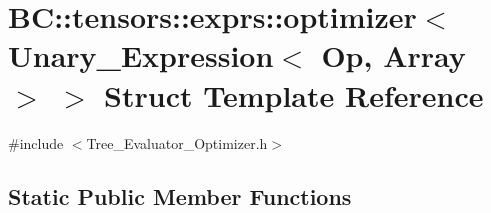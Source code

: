\hypertarget{structBC_1_1tensors_1_1exprs_1_1optimizer_3_01Unary__Expression_3_01Op_00_01Array_01_4_01_4}{}\section{BC\+:\+:tensors\+:\+:exprs\+:\+:optimizer$<$ Unary\+\_\+\+Expression$<$ Op, Array $>$ $>$ Struct Template Reference}
\label{structBC_1_1tensors_1_1exprs_1_1optimizer_3_01Unary__Expression_3_01Op_00_01Array_01_4_01_4}


{\ttfamily \#include $<$Tree\+\_\+\+Evaluator\+\_\+\+Optimizer.\+h$>$}

\subsection*{Static Public Member Functions}
